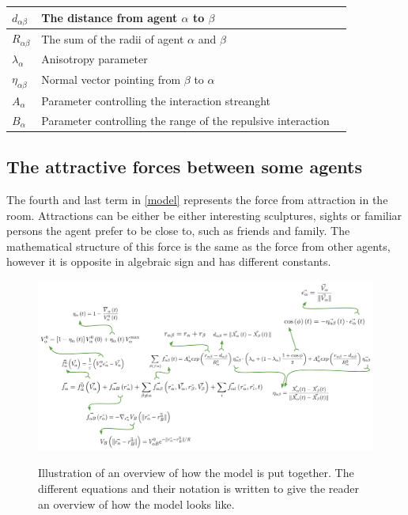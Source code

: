 
\begin{center}
\begin{tabular}{lll}
\hline
$d_{\alpha \beta}$& The distance from agent $\alpha$ to $\beta$ &\\
\hline
$R_{\alpha\beta}$& The sum of the radii of agent $\alpha$ and $\beta$ \\
\hline
$\lambda_{\alpha}$& Anisotropy parameter &\\
\hline
$\eta_{\alpha \beta}$& Normal vector pointing from $\beta$ to $\alpha$ \\
\hline
$A_{\alpha}$& Parameter controlling the interaction streanght \\
\hline
$B_{\alpha}$& Parameter controlling the range of the repulsive interaction  \\
\hline
\end{tabular}
\end{center}

\subsection{The attractive forces between some agents}
The fourth and last term in \eqref{model} represents the force from attraction 
in the room. Attractions can be either be either interesting sculptures, 
sights or familiar persons the agent prefer to be close to, such as friends 
and family. The mathematical structure of this force is the same as the force 
from other agents, however it is opposite in algebraic sign and has different 
constants. 

\begin{figure}[hb] %
    \centering
    {\includegraphics[scale=0.35]{Figures/overview.pdf}} 
    \caption[Overview of the model]{Illustration of an overview of how the model is put together. The different equations and their notation is written to give the 
	     reader an overview of how the model looks like.}
    \label{overview}
\end{figure}

